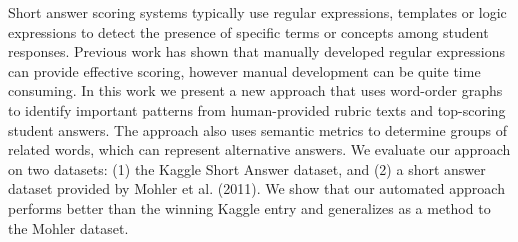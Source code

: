Short answer scoring systems typically use regular expressions, templates or logic expressions to detect the presence of specific terms or concepts among student responses. Previous work has shown that manually developed regular expressions can provide effective scoring, however manual development can be quite time consuming. In this work we present a new approach that uses word-order graphs to identify important patterns from human-provided rubric texts and top-scoring student answers. The approach also uses semantic metrics to determine groups of related words, which can represent alternative answers. We evaluate our approach on two datasets: (1) the Kaggle Short Answer dataset, and (2) a short answer dataset provided by Mohler et al. (2011). We show that our automated approach performs better than the winning Kaggle entry and generalizes as a method to the Mohler dataset.
